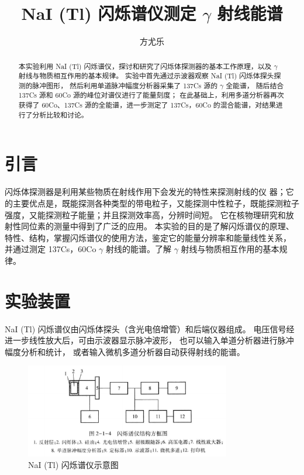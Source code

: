 \documentclass[revtex4-2]{mpltx}
\begin{document}
\title{NaI (Tl) 闪烁谱仪测定 $\gamma$ 射线能谱}
\author{方尤乐}

\begin{abstract}
    本实验利用 NaI (Tl) 闪烁谱仪，探讨和研究了闪烁体探测器的基本工作原理，以及 $\gamma$ 射线与物质相互作用的基本规律。
    实验中首先通过示波器观察 NaI (Tl) 闪烁体探头探测的脉冲图形，
    然后利用单道脉冲幅度分析器采集了 137Cs 源的 $\gamma$ 全能谱，
    随后结合 137Cs 源和 60Co 源的峰位对谱仪进行了能量刻度；
    在此基础上，利用多道分析器再次获得了 60Co、137Cs 源的全能谱，进一步测定了 137Cs，60Co 的混合能谱，对结果进行了分析比较和讨论。
\end{abstract}
\maketitle
\section{引言}
    闪烁体探测器是利用某些物质在射线作用下会发光的特性来探测射线的仪
    器；它的主要优点是，既能探测各种类型的带电粒子，又能探测中性粒子，既能探测粒子强度，又能探测粒子能量；并且探测效率高，分辨时间短。
    它在核物理研究和放射性同位素的测量中得到了广泛的应用。
    本实验的目的是了解闪烁谱仪的原理、特性、结构，掌握闪烁谱仪的使用方法，鉴定它的能量分辨率和能量线性关系，
    并通过测定 137Cs，60Co  $\gamma$ 射线的能谱。了解 $\gamma$ 射线与物质相互作用的基本规律。
\section{实验装置}
    NaI (Tl) 闪烁谱仪由闪烁体探头（含光电倍增管）和后端仪器组成。
    电压信号经进一步线性放大后，可由示波器显示脉冲波形，
    也可以输入单道分析器进行脉冲幅度分析和统计，
    或者输入微机多道分析器自动获得射线的能谱。
    
    \begin{figure}[htbp]
        \centering
        \includegraphics[width=0.8\textwidth]{./pic0.png}
        \caption{NaI (Tl) 闪烁谱仪示意图}\label{fig:0}
    \end{figure}
\end{document}
